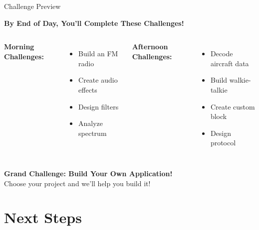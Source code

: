 \documentclass[aspectratio=169,11pt]{beamer}
\begin{document}
\begin{frame}{Challenge Preview}
\begin{center}
\Large\textbf{By End of Day, You'll Complete These Challenges!}
\end{center}
\vspace{1em}
\begin{columns}
\textbf{Morning Challenges:}
\begin{itemize}
    \item Build an FM radio
    \item Create audio effects
    \item Design filters
    \item Analyze spectrum
\end{itemize}

\textbf{Afternoon Challenges:}
\begin{itemize}
    \item Decode aircraft data
    \item Build walkie-talkie
    \item Create custom block
    \item Design protocol
\end{itemize}
\end{columns}
\vspace{1em}
\begin{center}\colorbox{yellow!20}{\parbox{0.9\textwidth}{
\centering
\Large\textbf{Grand Challenge: Build Your Own Application!}\\
\normalsize Choose your project and we'll help you build it!
}}\end{center}
\end{frame}


\section{Next Steps}
\end{document}

